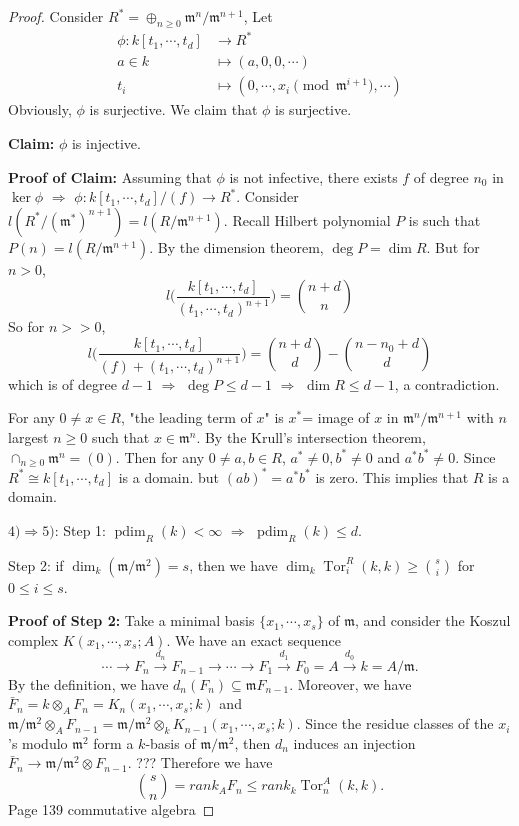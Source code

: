 \documentclass[cs4size]{article}
\newcommand{\su}{\subseteq}
\newcommand{\rk}{rank}
\newcommand{\frm}{\mathfrak{m}}
\newcommand{\ra}{\rightarrow}
\newcommand{\xr}{\xrightarrow}
\newcommand{\Ra}{\Rightarrow}
\DeclareMathOperator{\Tor}{Tor}
\DeclareMathOperator{\pdim}{pdim}
\begin{document}
\begin{proof}
Consider $R^*=\oplus_{n\geq 0}\frm^n/\frm^{n+1}$, Let
\begin{align*}
\phi: k[t_1,\cdots,t_d]&\ra R^*\\
a\in k&\mapsto (a,0,0,\cdots)\\
t_i&\mapsto (0,\cdots,x_i\pmod \frm^{i+1},\cdots)
\end{align*}
Obviously, $\phi$ is surjective. We claim that $\phi$ is surjective.

\textbf{Claim:} $\phi$ is injective.

\textbf{Proof of Claim:} Assuming that $\phi$ is not infective, there exists $f$ of degree $n_0$ in $\ker \phi$ $\Ra$ $\phi: k[t_1,\cdots,t_d]/(f)\ra R^*$. Consider $l(R^*/(\frm^*)^{n+1})=l(R/\frm^{n+1})$. Recall Hilbert polynomial $P$ is such that $P(n)=l(R/\frm^{n+1})$. By the dimension theorem, $\deg P=\dim R$. But for $n>0$, \[l\bigg(\frac{k[t_1,\cdots,t_d]}{(t_1,\cdots,t_d)^{n+1}}\bigg)=\binom{n+d}{n}\]
So for $n>>0$,
\[l\bigg(\frac{k[t_1,\cdots,t_d]}{(f)+(t_1,\cdots,t_d)^{n+1}}\bigg)
=\binom{n+d}{d}-\binom{n-n_0+d}{d}\]
which is of degree $d-1$ $\Ra$ $\deg P\leq d-1$ $\Ra$ $ \dim R\leq d-1$, a contradiction.

For any $0\neq x\in R$, "the leading term of $x$" is $x^*$= image of $x$ in $\frm^n/\frm^{n+1}$ with $n$ largest $n\geq 0$ such that $x\in\frm^n$. By the Krull's intersection theorem, $\cap_{n\geq 0}\frm^n=(0)$. Then for any $0\neq a,b\in R$, $a^*\neq 0,b^*\neq 0$ and $a^*b^*\neq 0$. Since $R^*\cong k[t_1,\cdots,t_d]$ is a domain. but $(ab)^*=a^*b^*$ is zero. This implies that $R$ is a domain.

$4)\Ra 5)$: Step 1: $\pdim_R(k)<\infty$ $\Ra$ $\pdim_R(k)\leq d$.

Step 2: if $\dim_k(\frm/\frm^2)=s$, then we have $\dim_k \Tor_i^R(k,k)\geq\binom{s}{i}$ for $0\leq i\leq s$.

\textbf{Proof of Step 2: }Take a minimal basis $\{x_1,\cdots,x_s\}$ of $\frm$, and consider the Koszul complex $K(x_1,\cdots,x_s;A)$. We have an exact sequence
\[\cdots\ra F_n\xr{d_n}F_{n-1}\ra\cdots\ra F_1\xr{d_1}F_0=A\xr{d_0}k=A/\frm.\]
By the definition, we have $d_n(F_n)\su\frm F_{n-1}$. Moreover, we have $\bar{F}_n=k\otimes_A F_n=K_n(x_1,\cdots,x_s;k)$ and $\frm/\frm^2\otimes_AF_{n-1}=\frm/\frm^2\otimes_kK_{n-1}(x_1,\cdots,x_s;k)$. Since the residue classes of the $x_i$'s modulo $\frm^2$ form a $k$-basis of $\frm/\frm^2$, then $d_n$ induces an injection $\bar{F}_n\ra \frm/\frm^2\otimes F_{n-1}$. ??? Therefore we have
\[\binom{s}{n}=\rk_A F_n\leq \rk_k\Tor_n^A(k,k).\]
Page 139 commutative algebra
\end{proof}
\end{document}

